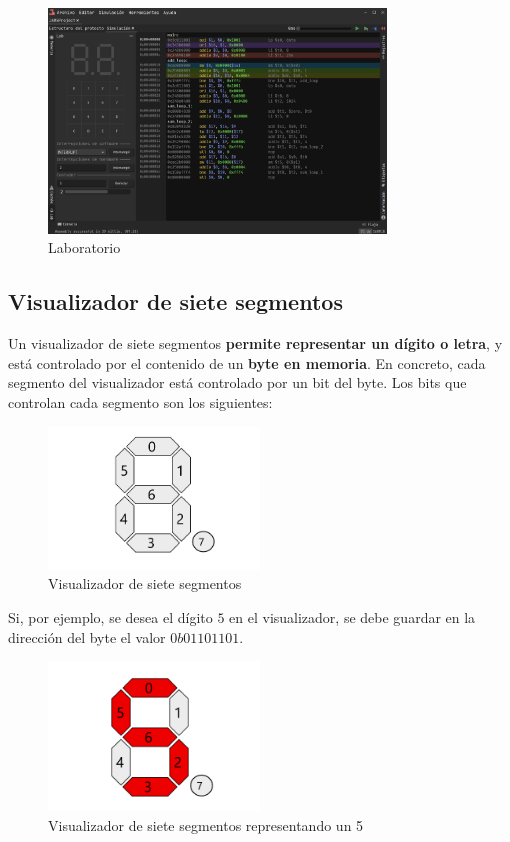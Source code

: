 \begin{figure}[H]
    \centering
    \includegraphics[width=0.8\textwidth]{images/tools/jams-lab}
    \caption{Laboratorio}
    \label{fig:jams-lab}
\end{figure}

\subsection{Visualizador de siete segmentos}\label{subsec:visualizador-de-siete-segmentos}

Un visualizador de siete segmentos \textbf{permite representar un dígito o letra},
y está controlado por el contenido de un \textbf{byte en memoria}.
En concreto, cada segmento del visualizador está controlado por un bit del byte.
Los bits que controlan cada segmento son los siguientes:

\begin{figure}[H]
    \centering
    \includegraphics[width=0.5\textwidth]{images/tools/jams-seven-segment}
    \caption{Visualizador de siete segmentos}
    \label{fig:jams-seven-segment}
\end{figure}

\noindent Si, por ejemplo, se desea el dígito $5$ en el visualizador,
se debe guardar en la dirección del byte el valor $0b01101101$.

\begin{figure}[H]
    \centering
    \includegraphics[width=0.5\textwidth]{images/tools/jams-seven-segment-active}
    \caption{Visualizador de siete segmentos representando un 5}
    \label{fig:jams-seven-segment-active}
\end{figure}


